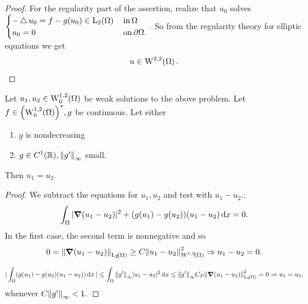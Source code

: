 \documentclass{article}
\begin{document}
\begin{example}
\begin{proof}
		For the regularity part of the assertion, realize that $u_0$ solves 
		$\begin{cases}
			-\laplace u_0 = f-g(u_0) \in \LpSet[2]{\Omega} & \, \text{in} \, \Omega \\
			u_0 = 0 & \, \text{on} \, \partial \Omega. 
		\end{cases}.$ So from the regularity theory for elliptic equations we get
		\[
			u \in \WkpSet[2][2]{\Omega}.
		\]
	\end{proof}
	\begin{theorem}[Uniqueness]
		Let $u_1, u_2 \in \WkpzeroSet[1][2]{\Omega}$ be weak solutions to the above problem. Let $f \in \qty(\WkpzeroSet[1][2]{\Omega})^{*},g$ be continuous. Let either 
		\begin{enumerate}
			\item $g$ is nondecreasing
			\item $g \in C^1\qty({\mathbb R}), \norm{g'}_{\infty}$ small.
		\end{enumerate}
		Then $u_1 = u_2$.
	\end{theorem}
	\begin{proof}
		We subtract the equations for $u_1, u_2$ and test with $u_1 - u_2.$:
		\[
			\int_{\Omega}|\grad(u_1 - u_2)|^{2} + (g(u_1)-g(u_2))\qty(u_1-u_2)\dd{x} = 0.
		\]
		In the first case, the second term is nonnegative and so
		\[
			0=\norm{\grad(u_1 - u_2)}_{\LpSet[2]{\Omega}} \geq C \norm{u_1 - u_2}_{\WkpSet[1][2]{\Omega}}^{2} \Rightarrow u_1 - u_2 = 0.
		\]

		\[
			|\int_{\Omega}(g(u_1)-g(u_2)(u_1-u_2))\dd{x}| \leq \int_{\Omega}\norm{g'}_{\infty}|u_1 - u_2|^{2}\dd{x} \leq \norm{g'}_{\infty}C_P \norm{\grad(u_1 - u_2)}_{\LpSet[2]{\Omega}}^{2} = 0 \Rightarrow u_1 = u_2,
		\]
		whenever $C \norm{g'}_{\infty} <1.$
	\end{proof}
\end{example}
\end{document}
